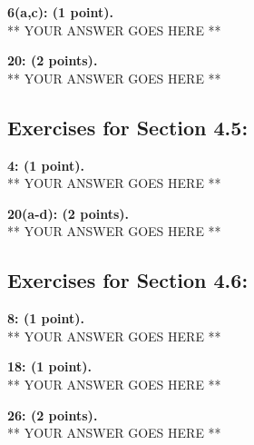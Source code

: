 \documentclass[12pt]{article}  %
\begin{document}
\noindent
{\bf 6(a,c): (1 point).} \\
** YOUR ANSWER GOES HERE **

\noindent
{\bf 20: (2 points).} \\
** YOUR ANSWER GOES HERE **

\subsection*{Exercises for Section 4.5:}     

\noindent
{\bf 4: (1 point).} \\
** YOUR ANSWER GOES HERE **

\noindent
{\bf 20(a-d): (2 points).} \\
** YOUR ANSWER GOES HERE **

\subsection*{Exercises for Section 4.6:}     

\noindent
{\bf 8: (1 point).} \\
** YOUR ANSWER GOES HERE **

\noindent
{\bf 18: (1 point).} \\
** YOUR ANSWER GOES HERE **

\noindent
{\bf 26: (2 points).} \\
** YOUR ANSWER GOES HERE **
\end{document}
